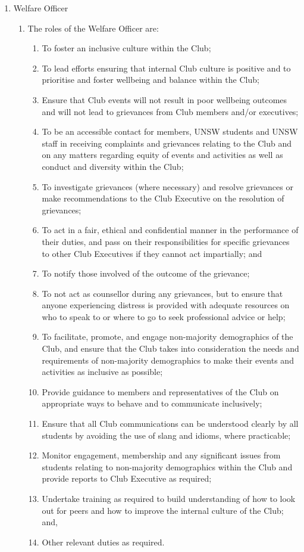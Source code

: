 \begin{enumerate}
\item Welfare Officer
  \begin{enumerate}
  \item The roles of the Welfare Officer are:
    \begin{enumerate}
    \item To foster an inclusive culture within the Club;
    \item To lead efforts ensuring that internal Club culture is positive and to prioritise and foster wellbeing and balance within the Club;
    \item Ensure that Club events will not result in poor wellbeing outcomes and will not lead to grievances from Club members and/or executives;
    \item To be an accessible contact for members, UNSW students and UNSW staff in receiving complaints and grievances relating to the Club and on any matters regarding equity of events and activities as well as conduct and diversity within the Club;
    \item To investigate grievances (where necessary) and resolve grievances or make recommendations to the Club Executive on the resolution of grievances;
    \item To act in a fair, ethical and confidential manner in the performance of their duties, and pass on their responsibilities for specific grievances to other Club Executives if they cannot act impartially; and
    \item To notify those involved of the outcome of the grievance;
    \item To not act as counsellor during any grievances, but to ensure that anyone experiencing distress is provided with adequate resources on who to speak to or where to go to seek professional advice or help;
    \item To facilitate, promote, and engage non-majority demographics of the Club, and ensure that the Club takes into consideration the needs and requirements of non-majority demographics to make their events and activities as inclusive as possible;
    \item Provide guidance to members and representatives of the Club on appropriate ways to behave and to communicate inclusively;
    \item Ensure that all Club communications can be understood clearly by all students by avoiding the use of slang and idioms, where practicable;
    \item Monitor engagement, membership and any significant issues from students relating to non-majority demographics within the Club and provide reports to Club Executive as required;
    \item Undertake training as required to build understanding of how to look out for peers and how to improve the internal culture of the Club; and,
    \item Other relevant duties as required.
    \end{enumerate}
  \end{enumerate}


\end{enumerate}
